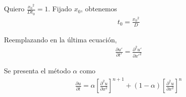 \documentclass[a4paper]{article}
\begin{document}
Quiero $\frac{{x_0}^2}{D t_0} = 1$. Fijado $x_0$, obtenemos
\begin{align*}
  t_0 = \frac{{x_0}^2}{D}
\end{align*}

Reemplazando en la última ecuación,
\begin{align*}
  \frac{\partial u'}{\partial t'} = \frac{\partial^2 u'}{\partial {x'}^2}
\end{align*}

Se presenta el método $\alpha$ como
\begin{align*}
  \frac{\partial u}{\partial t} = \alpha \left[\frac{\partial^2 u}{\partial x^2}\right]^{n+1} +
                                  (1 - \alpha) \left[\frac{\partial^2 u}{\partial x^2}\right]^n
\end{align*}
\end{document}
